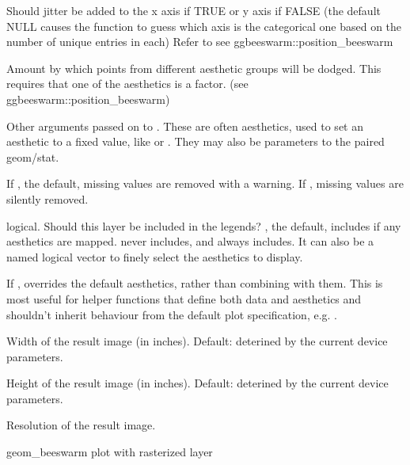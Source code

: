 \documentclass[a4paper]{book}
\begin{document}
\begin{Arguments}
\begin{ldescription}
\item[\code{groupOnX}] Should jitter be added to the x axis if TRUE or y axis if FALSE (the default NULL causes the function to guess which axis is the categorical one based on the number of unique entries in each) Refer to see ggbeeswarm::position\_beeswarm

\item[\code{dodge.width}] Amount by which points from different aesthetic groups will be dodged. This requires that one of the aesthetics is a factor. (see ggbeeswarm::position\_beeswarm)

\item[\code{...}] Other arguments passed on to . These are
often aesthetics, used to set an aesthetic to a fixed value, like
 or . They may also be parameters
to the paired geom/stat.

\item[\code{na.rm}] If , the default, missing values are removed with
a warning. If , missing values are silently removed.

\item[\code{show.legend}] logical. Should this layer be included in the legends?
, the default, includes if any aesthetics are mapped.
 never includes, and  always includes.
It can also be a named logical vector to finely select the aesthetics to
display.

\item[\code{inherit.aes}] If , overrides the default aesthetics,
rather than combining with them. This is most useful for helper functions
that define both data and aesthetics and shouldn't inherit behaviour from
the default plot specification, e.g. .

\item[\code{raster.width}] Width of the result image (in inches). Default: deterined by the current device parameters.

\item[\code{raster.height}] Height of the result image (in inches). Default: deterined by the current device parameters.

\item[\code{raster.dpi}] Resolution of the result image.
\end{ldescription}
\end{Arguments}
%
\begin{Value}
geom\_beeswarm plot with rasterized layer
\end{Value}
\end{document}
